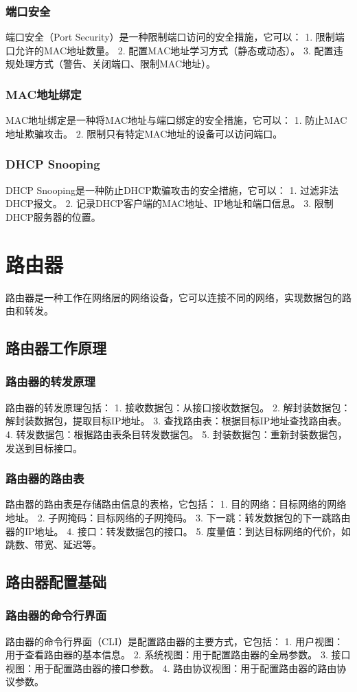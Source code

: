 \documentclass{book}
\begin{document}
\subsubsection{端口安全}
端口安全（Port Security）是一种限制端口访问的安全措施，它可以：
1. 限制端口允许的MAC地址数量。
2. 配置MAC地址学习方式（静态或动态）。
3. 配置违规处理方式（警告、关闭端口、限制MAC地址）。
\subsubsection{MAC地址绑定}
MAC地址绑定是一种将MAC地址与端口绑定的安全措施，它可以：
1. 防止MAC地址欺骗攻击。
2. 限制只有特定MAC地址的设备可以访问端口。
\subsubsection{DHCP Snooping}
DHCP Snooping是一种防止DHCP欺骗攻击的安全措施，它可以：
1. 过滤非法DHCP报文。
2. 记录DHCP客户端的MAC地址、IP地址和端口信息。
3. 限制DHCP服务器的位置。
\section{路由器}
路由器是一种工作在网络层的网络设备，它可以连接不同的网络，实现数据包的路由和转发。
\subsection{路由器工作原理}
\subsubsection{路由器的转发原理}
路由器的转发原理包括：
1. 接收数据包：从接口接收数据包。
2. 解封装数据包：解封装数据包，提取目标IP地址。
3. 查找路由表：根据目标IP地址查找路由表。
4. 转发数据包：根据路由表条目转发数据包。
5. 封装数据包：重新封装数据包，发送到目标接口。
\subsubsection{路由器的路由表}
路由器的路由表是存储路由信息的表格，它包括：
1. 目的网络：目标网络的网络地址。
2. 子网掩码：目标网络的子网掩码。
3. 下一跳：转发数据包的下一跳路由器的IP地址。
4. 接口：转发数据包的接口。
5. 度量值：到达目标网络的代价，如跳数、带宽、延迟等。
\subsection{路由器配置基础}
\subsubsection{路由器的命令行界面}
路由器的命令行界面（CLI）是配置路由器的主要方式，它包括：
1. 用户视图：用于查看路由器的基本信息。
2. 系统视图：用于配置路由器的全局参数。
3. 接口视图：用于配置路由器的接口参数。
4. 路由协议视图：用于配置路由器的路由协议参数。
\end{document}
